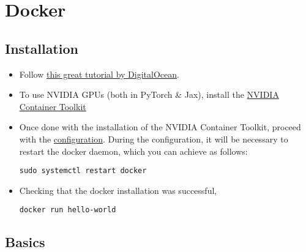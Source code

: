 \documentclass[12pt, a4paper]{scrbook}
\numberwithin{equation}{section}
\theoremstyle{definition}
\theoremstyle{definition}
\begin{document}
	\chapter{Docker}
	
	\section{Installation}
	
	\begin{itemize}
		\item Follow  \href{https://www.digitalocean.com/community/tutorials/how-to-install-and-use-docker-on-ubuntu-20-04}{this great tutorial by DigitalOcean}.
		
		\item To use NVIDIA GPUs (both in PyTorch \& Jax), install the \href{https://docs.nvidia.com/datacenter/cloud-native/container-toolkit/latest/install-guide.html#installing-with-apt}{NVIDIA Container Toolkit}
		
		\item Once done with the installation of the NVIDIA Container Toolkit, proceed with the \href{https://docs.nvidia.com/datacenter/cloud-native/container-toolkit/latest/install-guide.html#configuring-docker}{configuration}. During the configuration, it will be necessary to restart the docker daemon, which you can achieve as follows: 
		
		\begin{lstlisting}[style=mystylebash, xleftmargin=\parindent]
			sudo systemctl restart docker
		\end{lstlisting}
	
		\item Checking that the docker installation was successful, 
		
		\begin{lstlisting}[style=mystylebash, xleftmargin=\parindent]
			docker run hello-world
		\end{lstlisting}
		
	\end{itemize}
	
	\section{Basics}
	
\end{document}
